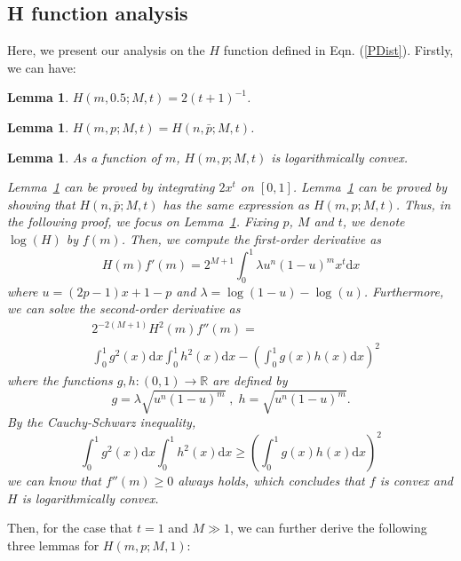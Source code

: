 \documentclass{article}
\makeatletter
\newcounter{lemmas}
\newtheorem{lemma}[lemmas]{Lemma}
\renewenvironment{proof}[1][\proofname]{\par
  \vspace{-\topsep}%
  \pushQED{\qed}%
  \normalfont
  \topsep0pt \partopsep0pt %
  \trivlist
  \item[\hskip\labelsep
        \itshape
    #1\@addpunct{.}]\ignorespaces
}{%
  \popQED\endtrivlist\@endpefalse
  \addvspace{0pt plus 0pt} %
}
\makeatother
\begin{document}
\subsection{H function analysis}
Here, we present our analysis on the $H$ function defined in Eqn. (\ref{PDist}).
Firstly, we can have:
\begin{lemma}
\label{MidPoint}
$H(m,0.5;M,t) = 2(t+1)^{-1}$.
\end{lemma}
\begin{lemma}
\label{Symmetry}
$H(m,p;M,t) = H(n, \bar{p};M,t)$.
\end{lemma}
\begin{lemma}
\label{LogConvexity}
As a function of $m$, $H(m,p;M,t)$ is logarithmically convex.
\begin{proof}
Lemma~\ref{MidPoint} can be proved by integrating $2 x^t$ on $[0,1]$.
Lemma~\ref{Symmetry} can be proved by showing that $H(n, \bar{p};M,t)$ has the same expression as $H(m,p;M,t)$.
Thus, in the following proof, we focus on Lemma~\ref{LogConvexity}. Fixing $p$, $M$ and $t$, we denote $\log (H)$ by $f(m)$. Then, we compute the first-order derivative as
\begin{equation}
H(m)f'(m)=2^{M+1}\int_{0}^{1}\lambda u^{n}(1-u)^{m}x^t\mathrm{d}x
\end{equation}
where $u= (2p-1)x+1-p$ and $\lambda=\log(1-u)-\log(u)$. Furthermore, we can solve the second-order derivative as
\begin{equation}
\begin{split}
&2^{-2(M+1)}H^2(m)f''(m)=\\
&\int_{0}^{1}g^2(x)\mathrm{d}x\int_{0}^{1}h^2(x)\mathrm{d}x-\left(\int_{0}^{1}g(x)h(x)\mathrm{d}x\right)^2
\end{split}
\end{equation}
where the functions $g,h:(0,1)\rightarrow  \mathbb{R}$ are defined by
\begin{equation}
g=\lambda\sqrt{u^{n}(1-u)^{m}}\;, \; h = \sqrt{u^{n}(1-u)^{m}}.
\end{equation}
By the Cauchy-Schwarz inequality,
\begin{equation}
\int_{0}^{1}g^2(x)\mathrm{d}x\int_{0}^{1}h^2(x)\mathrm{d}x\geq \left(\int_{0}^{1}g(x)h(x)\mathrm{d}x\right)^2
\end{equation}
we can know that $f''(m)\geq 0$ always holds, which concludes that $f$ is convex and $H$ is logarithmically convex.
\end{proof}
\end{lemma}
Then, for the case that $t=1$ and $M\gg 1$, we can further derive the following three lemmas for $H(m,p;M,1)$:
\end{document}
